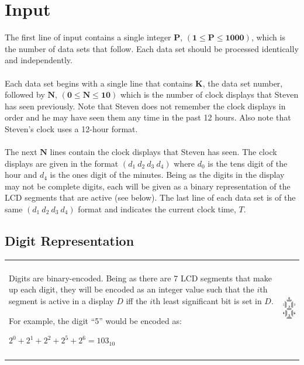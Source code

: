 \documentclass[11pt]{article}
\begin{document}
\section{Input}
The first line of input contains a single integer $\boldsymbol{P}$,
$(\boldsymbol{1} \le \boldsymbol{P} \le \boldsymbol{1000})$, which is the
number of data sets that follow. Each data set should be processed identically
and independently.
\\\\
Each data set begins with a single line that contains $\boldsymbol{K}$, the data
set number, followed by $\boldsymbol{N}$,
$(\boldsymbol{0} \le \boldsymbol{N} \le \boldsymbol{10})$ which is the number
of clock displays that Steven has seen previously. Note that Steven does not
remember the clock displays in order and he may have seen them any time in the past
12 hours. Also note that Steven's clock uses a 12-hour format.
\\\\
The next $\boldsymbol{N}$ lines  contain the clock displays that Steven has seen.
The clock displays are given in the format $(d_1\ d_2\ d_3\ d_4)$ where $d_0$ is
the tens digit of the hour and $d_4$ is the ones digit of the minutes. Being as
the digits in the display may not be complete digits, each will be given as
a binary representation of the LCD segments that are active (see below). The last
line of each data set is of the same $(d_1\ d_2\ d_3\ d_4)$ format and indicates
the current clock time, $T$.

\subsection{Digit Representation}
\begin{tabularx}{\textwidth}{X r}
\parbox[m]{10cm}{Digits are binary-encoded. Being as there are 7 LCD segments that
make up each digit, they will be encoded as an integer value such that the $i$th segment
is active in a display $D$ iff the $i$th least significant bit is set in $D$.
\\\\
For example, the digit ``5'' would be encoded as:
\begin{center}
$2^0 + 2^1 + 2^2 + 2^5 + 2^6 = 103_{10}$
\end{center}
} & \parbox[m]{5cm}{\includegraphics[height=120pt]{./assets/digit_binary.eps}} \\
\end{tabularx}
\end{document}
